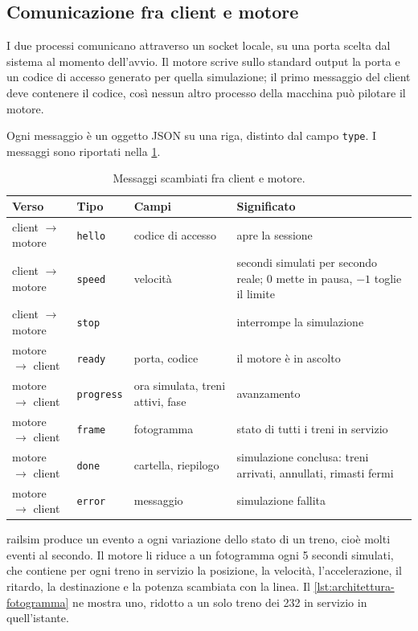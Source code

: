 \subsection{Comunicazione fra client e motore}
I due processi comunicano attraverso un socket locale, su una porta scelta dal sistema al momento dell'avvio. Il motore scrive sullo standard output la porta e un codice di accesso generato per quella simulazione; il primo messaggio del client deve contenere il codice, così nessun altro processo della macchina può pilotare il motore.

Ogni messaggio è un oggetto JSON su una riga, distinto dal campo \texttt{type}. I messaggi sono riportati nella \cref{tab:architettura-messaggi}.

\begin{table}[H]
	\centering
	\caption{Messaggi scambiati fra client e motore.}
	\label{tab:architettura-messaggi}
	\begin{tabularx}{\textwidth}{lll>{\raggedright\arraybackslash}X}
		\toprule
		Verso & Tipo & Campi & Significato \\
		\midrule
		client $\rightarrow$ motore & \texttt{hello} & codice di accesso & apre la sessione \\
		client $\rightarrow$ motore & \texttt{speed} & velocità & secondi simulati per secondo reale; 0 mette in pausa, $-1$ toglie il limite \\
		client $\rightarrow$ motore & \texttt{stop} & & interrompe la simulazione \\
		\midrule
		motore $\rightarrow$ client & \texttt{ready} & porta, codice & il motore è in ascolto \\
		motore $\rightarrow$ client & \texttt{progress} & ora simulata, treni attivi, fase & avanzamento \\
		motore $\rightarrow$ client & \texttt{frame} & fotogramma & stato di tutti i treni in servizio \\
		motore $\rightarrow$ client & \texttt{done} & cartella, riepilogo & simulazione conclusa: treni arrivati, annullati, rimasti fermi \\
		motore $\rightarrow$ client & \texttt{error} & messaggio & simulazione fallita \\
		\bottomrule
	\end{tabularx}
\end{table}

railsim produce un evento a ogni variazione dello stato di un treno, cioè molti eventi al secondo. Il motore li riduce a un fotogramma ogni 5 secondi simulati, che contiene per ogni treno in servizio la posizione, la velocità, l'accelerazione, il ritardo, la destinazione e la potenza scambiata con la linea. Il \cref{lst:architettura-fotogramma} ne mostra uno, ridotto a un solo treno dei 232 in servizio in quell'istante.

